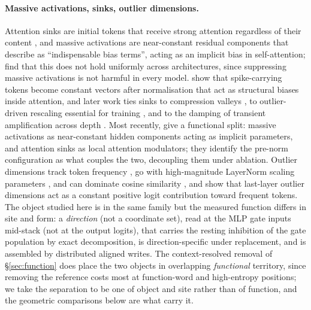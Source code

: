 \documentclass[11pt]{article}
\begin{document}
\paragraph{Massive activations, sinks, outlier dimensions.} Attention
sinks are initial tokens that receive strong attention regardless of
their content \citep{xiao2023}, and massive activations are near-constant
residual components that \citet{sun2024} describe as ``indispensable bias
terms'', acting as an implicit bias in self-attention; \citet{owen2025}
find that this does not hold uniformly across architectures, since
suppressing massive activations is not harmful in every model.
\citet{chen2026spikes} show that spike-carrying tokens become constant
vectors after normalisation that act as structural biases inside
attention, and later work ties sinks to compression valleys
\citep{queipo2025}, to outlier-driven rescaling essential for training
\citep{qiu2026}, and to the damping of transient amplification across
depth \citep{li2026}. Most recently, \citet{ssun2026} give a functional
split: massive activations as near-constant hidden components acting as
implicit parameters, and attention sinks as local attention modulators;
they identify the pre-norm configuration as what couples the two,
decoupling them under ablation. Outlier dimensions track token frequency
\citep{puccetti2022}, go with high-magnitude LayerNorm scaling parameters
\citep{kovaleva2021}, and can dominate cosine similarity
\citep{timkey2021},
and \citet{macocco2025} show that last-layer outlier dimensions act as
a constant positive logit contribution toward frequent tokens. The
object studied here is in the same family but the measured function
differs in site and form: a \emph{direction} (not a coordinate set),
read at the MLP gate inputs mid-stack (not at the output logits), that
carries the resting inhibition of the gate population by exact
decomposition, is direction-specific under replacement, and is
assembled by distributed aligned writes. The context-resolved removal
of \S\ref{sec:function} does place the two objects in overlapping
\emph{functional} territory, since removing the reference costs most at
function-word and high-entropy positions; we take the separation to be one of
object and site rather than of function, and the geometric comparisons
below are what carry it.
\end{document}

